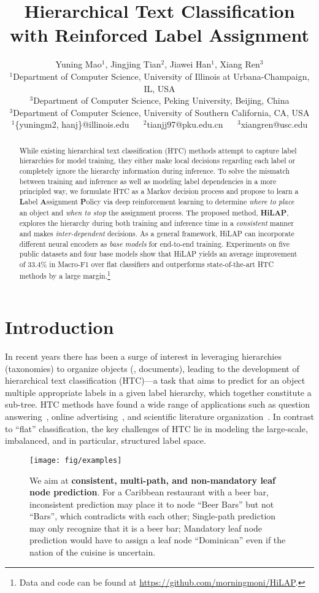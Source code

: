\documentclass[11pt,a4paper]{article}
\title{Hierarchical Text Classification with Reinforced Label Assignment}
\author{Yuning Mao$^{1}$, Jingjing Tian$^{2}$, Jiawei Han$^1$, Xiang Ren$^3$ \\
$^1$Department of Computer Science, University of Illinois at Urbana-Champaign, IL, USA \\
$^3$Department of Computer Science, Peking University, Beijing, China\\
$^3$Department of Computer Science, University of Southern California, CA, USA\\
$^1$\{yuningm2, hanj\}@illinois.edu $\quad$
  $^2$tianjj97@pku.edu.cn $\quad$ $^3$xiangren@usc.edu
}
\date{}
\begin{document}
\maketitle
\begin{abstract}
While existing hierarchical text classification (HTC) methods attempt to capture label hierarchies for model training, they either make local decisions regarding each label or completely ignore the hierarchy information during inference. 
To solve the mismatch between training and inference as well as modeling label dependencies in a more principled way, 
we formulate HTC as a Markov decision process and propose to learn a \textbf{L}abel \textbf{A}ssignment \textbf{P}olicy via deep reinforcement learning to determine \textit{where to place} an object and \textit{when to stop} the assignment process. 
The proposed method, \textbf{HiLAP}, explores the hierarchy during both training and inference time in a \textit{consistent} manner and makes \textit{inter-dependent} decisions.
As a general framework, HiLAP can incorporate different neural encoders as \textit{base models} for end-to-end training.
Experiments on five public datasets and four base models show that HiLAP yields an average improvement of 33.4\% in Macro-F1 over flat classifiers and outperforms state-of-the-art HTC methods by a large margin.\footnote{\scriptsize Data and code can be found at \url{https://github.com/morningmoni/HiLAP}.}
\end{abstract}


\section{Introduction}

In recent years there has been a surge of interest in leveraging hierarchies (taxonomies) to organize objects (\eg, documents), leading to the development of hierarchical text classification (HTC)---a task that aims to predict for an object multiple appropriate labels in a given label hierarchy, which together constitute a sub-tree. HTC methods have found a wide range of applications such as question answering~\citep{Qu2012AnEO}, online advertising~\citep{agrawal2013multi}, and scientific literature organization~\citep{peng2016deepmesh}.
In contrast to ``flat'' classification, the key challenges of HTC lie in modeling the large-scale, imbalanced, and in particular, structured label space.

\begin{figure}[t]
    \centering
    \texttt{[image: fig/examples]}
     \caption{We aim at \textbf{consistent, multi-path, and non-mandatory leaf node prediction}. For a Caribbean restaurant with a beer bar, inconsistent prediction may place it to node ``Beer Bars'' but not ``Bars'', which contradicts with each other; Single-path prediction may only recognize that it is a beer bar; Mandatory leaf node prediction would have to assign a leaf node ``Dominican'' even if the nation of the cuisine is uncertain.}
    \label{fig:examples}
    \vspace*{-.1cm}
\end{figure}
\end{document}
